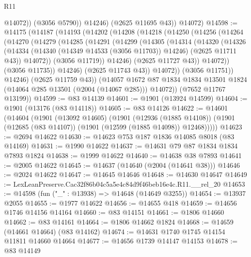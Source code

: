 \begin{lexlean}{R11}
\begin{coremodule}
                @14072))
            (@3056 @5790))
          @14246)
        (@2625 @11695 @43))
      @14072)
@14598 := @14175
    (@14187
      (@14193
        (@14202
          (@14208
            (@14218
              (@14250
                (@14256
                  (@14264
                    (@14270
                      (@14279
                        (@14285
                          (@14291
                            (@14299
                              (@14305
                                (@14314
                                  (@14320
                                    (@14326
                                      (@14334
                                        (@14340 (@14349 @14533 (@3056 @11703)) @14246)
                                        (@2625 @11711 @43))
                                      @14072))
                                  (@3056 @11719))
                                @14246)
                              (@2625 @11727 @43))
                            @14072))
                        (@3056 @11735))
                      @14246)
                    (@2625 @11743 @43))
                  @14072))
              (@3056 @11751))
            @14246)
          (@2625 @11759 @43))
        (@14057
          @1672
          @87
          @1834
          @1834
          @13501
          @1824
          (@14064 @285 @13501 (@2004 (@14067 @285)))
          @14072))
      (@7652 @11767 @13199))
@14599 := @83 @14139
@14601 := @1901 (@13924 @14599)
@14604 := @1901 (@13176 (@83 @14118))
@14605 := @83 @14126
@14622 := @14601
    (@14604
      (@1901
        (@13092 @14605)
        (@1901
          (@12936 (@1885 @14108))
          (@1901 (@12685 (@83 @14107)) (@1901 (@12599 (@1885 @14098)) @12468)))))
@14623 := @2694 @14622
@14630 := @14623 @753 @187 @1836 @14085 @8018 (@83 @14169)
@14631 := @1990 @14622
@14637 := @14631 @79 @87 @1834 @1834 @7893 @1824
@14638 := @1999 @14622
@14640 := @14638 @38 @7893
@14641 := @2005 @14622
@14645 := @14637 (@14640 (@2004 (@14641 @38)))
@14646 := @2024 @14622
@14647 := @14645 @14646
@14648 := @14630 @14647
@14649 := LexLeanPreserve.Cac32f86b04c5a5e4c84d9f46beb16e4c.R11.__rel_20
@14653 := @14598 (fun ("_" : @13938) => @14648 (@14649 @3255))
@14654 := @13937 @2055
@14655 := @1977 @14622
@14656 := @14655 @418
@14659 := @14656 @1746 @14156 @14164
@14660 := @83 @14151
@14661 := @1806 @14660
@14662 := @83 @14161
@14664 := @1806 @14662 @1824
@14668 := @14659 (@14661 @14664) (@83 @14162)
@14674 := @14631 @1740 @1745 @14154 @11811 @14660 @14664
@14677 := @14656 @1739 @14147 @14153
@14678 := @83 @14149

\end{coremodule}
\end{lexlean}

